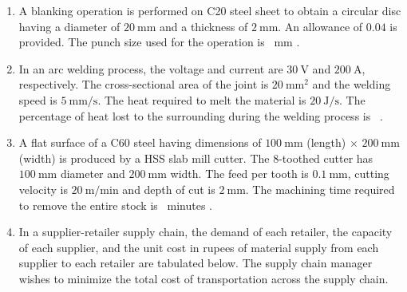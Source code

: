 \documentclass[journal]{IEEEtran}
\begin{document}
\begin{enumerate}[leftmargin=0pt]
\hfill{}

\vspace{4mm}

\item
A blanking operation is performed on C20 steel sheet to obtain a circular disc having a diameter of $20~\text{mm}$ and a thickness of $2~\text{mm}$. An allowance of $0.04$ is provided. The punch size used for the operation is \underline{\hspace{2cm}}~mm .

\hfill{}

\vspace{4mm}

\item
In an arc welding process, the voltage and current are $30~\text{V}$ and $200~\text{A}$, respectively. The cross-sectional area of the joint is $20~\text{mm}^2$ and the welding speed is $5~\text{mm/s}$. The heat required to melt the material is $20~\text{J/s}$. The percentage of heat lost to the surrounding during the welding process is \underline{\hspace{2cm}}~.

\hfill{}

\vspace{4mm}

\item
A flat surface of a C60 steel having dimensions of $100~\text{mm}$ (length) $\times$ $200~\text{mm}$ (width) is produced by a HSS slab mill cutter. The 8-toothed cutter has $100~\text{mm}$ diameter and $200~\text{mm}$ width. The feed per tooth is $0.1~\text{mm}$, cutting velocity is $20~\text{m/min}$ and depth of cut is $2~\text{mm}$. The machining time required to remove the entire stock is \underline{\hspace{2cm}}~minutes .

\hfill{}

\vspace{4mm}

\item
In a supplier-retailer supply chain, the demand of each retailer, the capacity of each supplier, and the unit cost in rupees of material supply from each supplier to each retailer are tabulated below. The supply chain manager wishes to minimize the total cost of transportation across the supply chain.


\end{enumerate}
\end{document}

